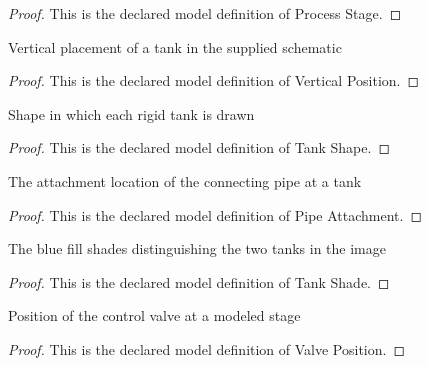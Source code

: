 \begin{proof}
  This is the declared model definition of Process Stage.
\end{proof}
\begin{definition}
  \label{def:physics:phyx-mini-0400:phyxminiproblems-problemphyxmini0400-verticalposition}
  Vertical placement of a tank in the supplied schematic
\end{definition}
\begin{proof}
  This is the declared model definition of Vertical Position.
\end{proof}
\begin{definition}
  \label{def:physics:phyx-mini-0400:phyxminiproblems-problemphyxmini0400-tankshape}
  Shape in which each rigid tank is drawn
\end{definition}
\begin{proof}
  This is the declared model definition of Tank Shape.
\end{proof}
\begin{definition}
  \label{def:physics:phyx-mini-0400:phyxminiproblems-problemphyxmini0400-pipeattachment}
  The attachment location of the connecting pipe at a tank
\end{definition}
\begin{proof}
  This is the declared model definition of Pipe Attachment.
\end{proof}
\begin{definition}
  \label{def:physics:phyx-mini-0400:phyxminiproblems-problemphyxmini0400-tankshade}
  The blue fill shades distinguishing the two tanks in the image
\end{definition}
\begin{proof}
  This is the declared model definition of Tank Shade.
\end{proof}
\begin{definition}
  \label{def:physics:phyx-mini-0400:phyxminiproblems-problemphyxmini0400-valveposition}
  Position of the control valve at a modeled stage
\end{definition}
\begin{proof}
  This is the declared model definition of Valve Position.
\end{proof}

